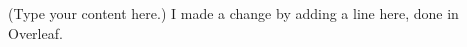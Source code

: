 \documentclass{article}
\begin{document}
(Type your content here.)
I made a change by adding a line here, done in Overleaf.
\end{document}
